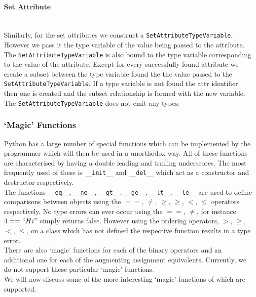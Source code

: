 \documentclass[12pt, titlepage]{article}
\begin{document}
\paragraph*{Set Attribute}\mbox{} \\
Similarly, for the set attributes we construct a \texttt{SetAttributeTypeVariable}. However we pass it the type variable of the value being passed to the attribute. The \texttt{SetAttributeTypeVariable} is also bound to the type variable corresponding to the value of the attribute. Except for every successfully found attribute we create a subset between the type variable found the the value passed to the \texttt{SetAttributeTypeVariable}. If a type variable is not found the attr identifier then one is created and the subset relationship is formed with the new variable. The \texttt{SetAttributeTypeVariable} does not emit any types.


\subsubsection{`Magic' Functions}
Python has a large number of special functions which can be implemented by the programmer which will then be used in a unorthodox way. All of these functions are characterised by having a double leading and trailing underscores. The most frequently used of these is \texttt{\_\_init\_\_} and \texttt{\_\_del\_\_} which act as a constructor and destructor respectively. \\
\indent The functions \texttt{\_\_eq\_\_}, \texttt{\_\_ne\_\_}, \texttt{\_\_gt\_\_}, \texttt{\_\_ge\_\_}, \texttt{\_\_lt\_\_}, \texttt{\_\_le\_\_} are used to define comparisons between objects using the $==$, $\neq$, $\ge$, $\geq$, $<$, $\leq$ operators respectively. No type errors can ever occur using the $==$, $\neq$, for instance $4 == ``Hi"$ simply returns false. However using the ordering operators, $>$, $\geq$, $<$, $\leq$, on a class which has not defined the respective function results in a type error. \\
There are also `magic' functions for each of the binary operators and an additional one for each of the augmenting assignment equivalents. Currently, we do not support these particular `magic' functions. \\
\indent We will now discuss some of the more interesting `magic' functions of which are supported.
\end{document}
